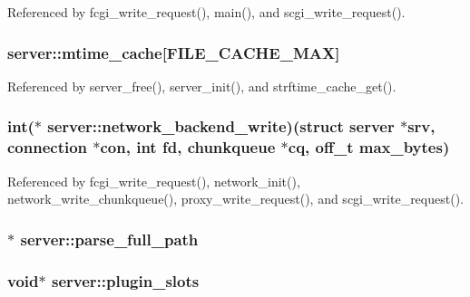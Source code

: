 Referenced by fcgi\-\_\-write\-\_\-request(), main(), and scgi\-\_\-write\-\_\-request().

\hypertarget{structserver_ad81dffe2cb285b67621f3ffb55b8012d}{
\subsubsection[{mtime\-\_\-cache}]{ server\-::mtime\-\_\-cache\mbox{[}{\bf F\-I\-L\-E\-\_\-\-C\-A\-C\-H\-E\-\_\-\-M\-A\-X}\mbox{]}}}\label{structserver_ad81dffe2cb285b67621f3ffb55b8012d}


Referenced by server\-\_\-free(), server\-\_\-init(), and strftime\-\_\-cache\-\_\-get().

\hypertarget{structserver_a70b0be520b7b3dbf881c52749b380fc9}{
\subsubsection[{network\-\_\-backend\-\_\-write}]{\setlength{\rightskip}{0pt plus 5cm}int($\ast$  server\-::network\-\_\-backend\-\_\-write)(struct {\bf server} $\ast$srv, {\bf connection} $\ast$con, int fd, {\bf chunkqueue} $\ast$cq, off\-\_\-t max\-\_\-bytes)}}\label{structserver_a70b0be520b7b3dbf881c52749b380fc9}


Referenced by fcgi\-\_\-write\-\_\-request(), network\-\_\-init(), network\-\_\-write\-\_\-chunkqueue(), proxy\-\_\-write\-\_\-request(), and scgi\-\_\-write\-\_\-request().

\hypertarget{structserver_a44af9c6606466641d97ae14d24c24fe7}{
\subsubsection[{parse\-\_\-full\-\_\-path}]{$\ast$ server\-::parse\-\_\-full\-\_\-path}}\label{structserver_a44af9c6606466641d97ae14d24c24fe7}
\hypertarget{structserver_aa2f45423f3ebe71282610e237ce2ae9a}{
\subsubsection[{plugin\-\_\-slots}]{\setlength{\rightskip}{0pt plus 5cm}void$\ast$ server\-::plugin\-\_\-slots}}\label{structserver_aa2f45423f3ebe71282610e237ce2ae9a}


